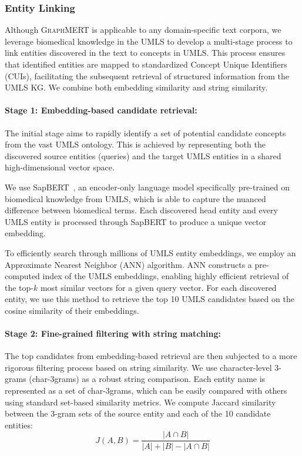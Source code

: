 \documentclass[10pt]{article}
\newcommand{\ours}{\textsc{GraphMERT}\xspace}
\begin{document}
\subsubsection{Entity Linking}
\label{subsubsec_similarity_matching}

Although \ours is applicable to any domain-specific text corpora, we leverage biomedical knowledge in the UMLS to develop a multi-stage process to link entities discovered in the text to concepts in UMLS. This process ensures that identified entities are mapped to standardized Concept Unique Identifiers (CUIs), facilitating the subsequent retrieval of structured information from the UMLS KG. We combine both embedding similarity and string similarity.

\paragraph{Stage 1: Embedding-based candidate retrieval:}
The initial stage aims to rapidly identify a set of potential candidate concepts from the vast UMLS ontology. This is achieved by representing both the discovered source entities (queries) and the target UMLS entities in a shared high-dimensional vector space.

We use SapBERT~\cite{lim2022sapbert}, an encoder-only language model specifically pre-trained on biomedical knowledge from UMLS, which is able to capture the nuanced difference between biomedical terms. Each discovered head entity and every UMLS entity is processed through SapBERT to produce a unique vector embedding.

To efficiently search through millions of UMLS entity embeddings, we employ an Approximate Nearest Neighbor (ANN) algorithm. ANN constructs a pre-computed index of the UMLS embeddings, enabling highly efficient retrieval of the top-$k$ most similar vectors for a given query vector. For each discovered entity, we use this method to retrieve the top 10 UMLS candidates based on the cosine similarity of their embeddings.

\paragraph{Stage 2: Fine-grained filtering with string matching:}
The top candidates from embedding-based retrieval are then subjected to a more rigorous filtering process based on string similarity. 
We use character-level 3-grams (char-3grams) as a robust string comparison. Each entity name is represented as a set of char-3grams, which can be easily compared with others using standard set-based similarity metrics. We compute Jaccard similarity between the 3-gram sets of the source entity and each of the 10 candidate entities:
\[
J(A, B) = \frac{|A \cap B|}{|A| + |B| - |A \cap B|}
\]
 
\end{document}
